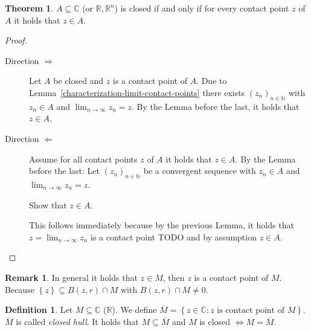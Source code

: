 \documentclass[a4paper,landscape,twocolumn]{article}
\theoremstyle{definition}
\newtheorem{theorem}{Theorem}
\newtheorem{defi}{Definition}
\newtheorem{rem}{Remark}
\newcommand\set[1]{\left\{#1\right\}}
\newcommand\seq[1]{{\left(#1\right)}_{n \in \mathbb N}}
\begin{document}
\begin{theorem}
  $A \subseteq \mathbb C$ (or $\mathbb R, \mathbb R^n$) is closed if and only if
  for every contact point $z$ of $A$ it holds that $z \in A$.
\end{theorem}
\begin{proof}
  \begin{description}
    \item[Direction $\Rightarrow$]
      Let $A$ be closed and $z$ is a contact point of $A$.
      Due to Lemma~\ref{characterization-limit-contact-points} there exists $\seq{z_n}$
      with $z_n \in A$ and $\lim_{n\to\infty} z_n = z$.
      By the Lemma before the last, it holds that $z \in A$.
    \item[Direction $\Leftarrow$]
      Assume for all contact points $z$ of $A$ it holds that $z \in A$.
      By the Lemma before the last: Let $\seq{z_n}$ be a convergent sequence with
      $z_n \in A$ and $\lim_{n\to\infty} z_n = z$.

      Show that $z \in A$.

      This follows immediately because by the previous Lemma, it holds that
      $z = \lim_{n\to\infty} z_n$ is a contact point TODO
      and by assumption $z \in A$.
  \end{description}
\end{proof}
\begin{rem}
  In general it holds that $z \in M$, then $z$ is a contact point of $M$.
  Because $\set{z} \subseteq B(z, r) \cap M$ with $B(z, r) \cap M \neq 0$.
\end{rem}
\begin{defi}
  Let $M \subseteq \mathbb C$ ($\mathbb R$).
  We define $\overline{M} = \set{z \in \mathbb C: z \text{ is contact point of } M}$.
  $\overline{M}$ is called \emph{closed hull}.
  It holds that $M \subseteq \overline{M}$ and $M$ is closed
  $\Leftrightarrow M = \overline{M}$.
\end{defi}
\end{document}
